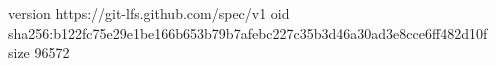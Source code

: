 version https://git-lfs.github.com/spec/v1
oid sha256:b122fc75e29e1be166b653b79b7afebc227c35b3d46a30ad3e8cce6ff482d10f
size 96572

